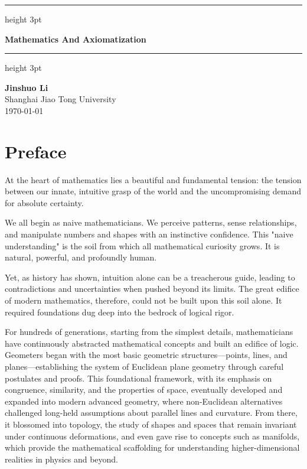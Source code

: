 \documentclass[oneside]{book}
\newcommand{\preface}{%
  \cleardoublepage
  \chapter*{Preface}
  \addcontentsline{toc}{chapter}{Preface}
}
\begin{document}
\begin{titlepage}


    \vspace*{3cm}
    {\color{elegantblue}\hrule height 3pt}
    \vspace{1cm}

    \noindent
    {\Huge \bfseries \color{elegantblue} Mathematics And Axiomatization\par}

    \vspace{1cm}
    {\color{elegantblue}\hrule height 3pt}

    \vfill
    \begin{flushleft}
        {\Large \textbf{Jinshuo Li}}\\[15pt]
        {\large Shanghai Jiao Tong University}\\[8pt]
        {\large \today}
    \end{flushleft}
    \vspace{2cm}
\end{titlepage}
\thispagestyle{empty}


\cleardoublepage

\tableofcontents
\thispagestyle{empty}

\cleardoublepage
\preface
\thispagestyle{empty}

At the heart of mathematics lies a beautiful and fundamental tension: the tension between our innate, intuitive grasp of the world and the uncompromising demand for absolute certainty.

We all begin as naive mathematicians. We perceive patterns, sense relationships, and manipulate numbers and shapes with an instinctive confidence. This "naive understanding" is the soil from which all mathematical curiosity grows. It is natural, powerful, and profoundly human.

Yet, as history has shown, intuition alone can be a treacherous guide, leading to contradictions and uncertainties when pushed beyond its limits. The great edifice of modern mathematics, therefore, could not be built upon this soil alone. It required foundations dug deep into the bedrock of logical rigor.

For hundreds of generations, starting from the simplest details, mathematicians have continuously abstracted mathematical concepts and built an edifice of logic. Geometers began with the most basic geometric structures—points, lines, and planes—establishing the system of Euclidean plane geometry through careful postulates and proofs. This foundational framework, with its emphasis on congruence, similarity, and the properties of space, eventually developed and expanded into modern advanced geometry, where non-Euclidean alternatives challenged long-held assumptions about parallel lines and curvature. From there, it blossomed into topology, the study of shapes and spaces that remain invariant under continuous deformations, and even gave rise to concepts such as manifolds, which provide the mathematical scaffolding for understanding higher-dimensional realities in physics and beyond.
\end{document}

